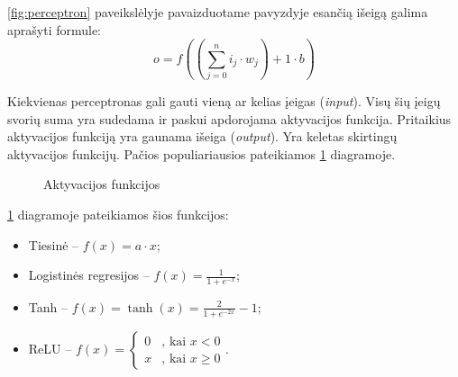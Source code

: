 \documentclass{VUMIFPSbakalaurinis}
\begin{document}
\ref{fig:perceptron} paveikslėlyje pavaizduotame pavyzdyje esančią išeigą galima aprašyti formule:
\begin{equation}
	o = f((\sum_{j=0}^{n}i_j \cdot w_j) + 1 \cdot b)
\end{equation}

Kiekvienas perceptronas gali gauti vieną ar kelias įeigas (\textit{input}). Visų šių įeigų svorių suma yra sudedama ir paskui apdorojama aktyvacijos funkcija. Pritaikius aktyvacijos funkciją yra gaunama išeiga (\textit{output}). Yra keletas skirtingų aktyvacijos funkcijų. Pačios populiariausios pateikiamos \ref{fig:aktyvacijosfunkc} diagramoje.
\begin{figure}
	\centering
	
	
	\caption{Aktyvacijos funkcijos} \label{fig:aktyvacijosfunkc}
\end{figure}


\ref{fig:aktyvacijosfunkc} diagramoje pateikiamos šios funkcijos:

\begin{itemize}
	\item Tiesinė – $f(x) = a \cdot x$;
	\item Logistinės regresijos – $f(x) = \frac{1}{1+e^{-x}}$;
	\item Tanh – $f(x) = \tanh(x) = \frac{2}{1+e^{-2x}} - 1$;
	\item ReLU – $f(x) = \begin{cases}
	0 & \text{, kai } x < 0 \\
	x & \text{, kai } x \ge 0
	\end{cases} $.
\end{itemize}
\end{document}
